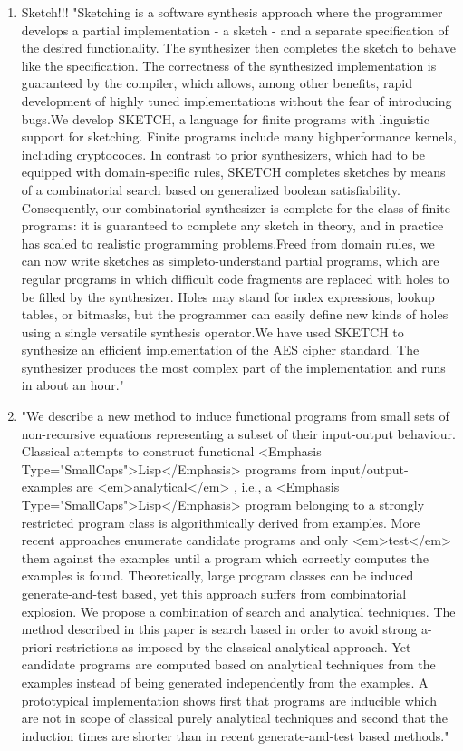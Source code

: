 \begin{enumerate}
\item Sketch!!! \cite{Solar-Lezama:2006:CSF:1168857.1168907} "Sketching is a software synthesis approach where the programmer develops a partial implementation - a sketch - and a separate specification of the desired functionality. The synthesizer then completes the sketch to behave like the specification. The correctness of the synthesized implementation is guaranteed by the compiler, which allows, among other benefits, rapid development of highly tuned implementations without the fear of introducing bugs.We develop SKETCH, a language for finite programs with linguistic support for sketching. Finite programs include many highperformance kernels, including cryptocodes. In contrast to prior synthesizers, which had to be equipped with domain-specific rules, SKETCH completes sketches by means of a combinatorial search based on generalized boolean satisfiability. Consequently, our combinatorial synthesizer is complete for the class of finite programs: it is guaranteed to complete any sketch in theory, and in practice has scaled to realistic programming problems.Freed from domain rules, we can now write sketches as simpleto-understand partial programs, which are regular programs in which difficult code fragments are replaced with holes to be filled by the synthesizer. Holes may stand for index expressions, lookup tables, or bitmasks, but the programmer can easily define new kinds of holes using a single versatile synthesis operator.We have used SKETCH to synthesize an efficient implementation of the AES cipher standard. The synthesizer produces the most complex part of the implementation and runs in about an hour."
\item \cite{Kitzelmann:2009:AIF:1530575.1530582} "We describe a new method to induce functional programs from small sets of non-recursive equations representing a subset of their input-output behaviour. Classical attempts to construct functional <Emphasis Type="SmallCaps">Lisp</Emphasis> programs from input/output-examples are <em>analytical</em> , i.e., a <Emphasis Type="SmallCaps">Lisp</Emphasis> program belonging to a strongly restricted program class is algorithmically derived from examples. More recent approaches enumerate candidate programs and only <em>test</em> them against the examples until a program which correctly computes the examples is found. Theoretically, large program classes can be induced generate-and-test based, yet this approach suffers from combinatorial explosion. We propose a combination of search and analytical techniques. The method described in this paper is search based in order to avoid strong a-priori restrictions as imposed by the classical analytical approach. Yet candidate programs are computed based on analytical techniques from the examples instead of being generated independently from the examples. A prototypical implementation shows first that programs are inducible which are not in scope of classical purely analytical techniques and second that the induction times are shorter than in recent generate-and-test based methods."

\end{enumerate}
